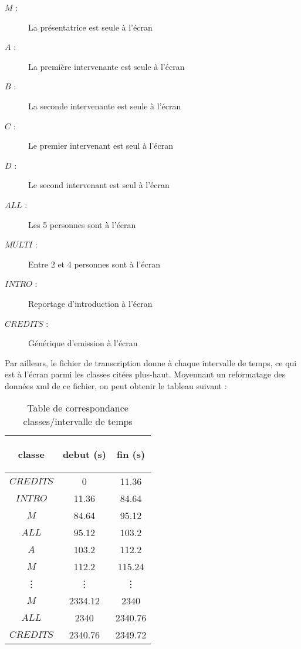\documentclass{book}
\begin{document}
\begin{description} %

\item[$M$ :] La présentatrice est seule à l'écran
\item[$A$ :] La première intervenante est seule à l'écran
\item[$B$ :] La seconde intervenante est seule à l'écran
\item[$C$ :] Le premier intervenant est seul à l'écran
\item[$D$ :] Le second intervenant est seul à l'écran
\item[$ALL$ :] Les 5 personnes sont à l'écran
\item[$MULTI$ :] Entre 2 et 4 personnes sont à l'écran
\item[$INTRO$ :] Reportage d'introduction à l'écran
\item[$CREDITS$ :] Générique d'emission à l'écran\\

\end{description}

Par ailleurs, le fichier de transcription donne à chaque intervalle de temps, ce qui est à l'écran parmi les classes citées plus-haut. 
Moyennant un reformatage des données xml de ce fichier, on peut obtenir le tableau suivant :

\begin{table}[H]
\begin{center}
\begin{tabular}{|c|c|c|}
\hline
\begin{bf}classe\end{bf} & \begin{bf}debut (s)\end{bf} & \begin{bf}fin (s)\end{bf} \\
\hline
$CREDITS$	& 0 & 11.36 \\
\hline
$INTRO$   & 11.36	& 84.64 \\
\hline
$M$	& 84.64	& 95.12 \\
\hline
$ALL$	& 95.12	& 103.2 \\
\hline
$A$	& 103.2	& 112.2 \\
\hline
$M$	& 112.2	& 115.24 \\
\hline
\vdots & \vdots &\vdots \\
\hline
$M$	& 2334.12 & 2340 \\
\hline
$ALL$	& 2340 & 2340.76 \\
\hline
$CREDITS$	& 2340.76 & 2349.72 \\
\hline
\end{tabular}
\end{center}
\caption{Table de correspondance classes/intervalle de temps}
\label{Table correspondance classe/temps}
\end{table}
\clearpage
\end{document}
